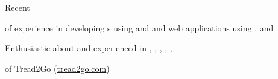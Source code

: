 

\begin{cvparagraph}
    \begin{summaryitems}
        \item Recent 
        \item {} of experience in developing s using  and  and web applications using ,  and 
        \item Enthusiastic about and experienced in , , , , , 
        \item {} of Tread2Go (\underline{\href{https://www.tread2go.com}{tread2go.com}})
    \end{summaryitems}

\end{cvparagraph}

